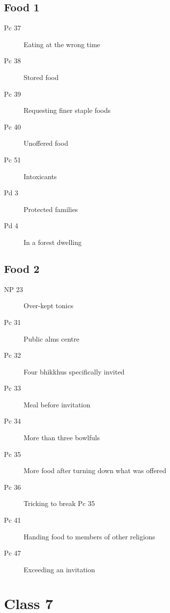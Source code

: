 \documentclass[11pt,oneside]{memoir}
\begin{document}
\begin{multicols}{2}

\section{Food 1}

\begin{description}
\item[Pc 37] Eating at the wrong time
\item[Pc 38 \orig] Stored food%
\item[Pc 39] Requesting finer staple foods
\item[Pc 40 \orig] Unoffered food%
\item[Pc 51 \orig] Intoxicants%
\item[Pd 3] Protected families
\item[Pd 4 \orig] In a forest dwelling%
\end{description}

\columnbreak

\section{Food 2}

\begin{description}
\item[NP 23 \orig] Over-kept tonics%
\item[Pc 31 \orig] Public alms centre%
\item[Pc 32] Four bhikkhus specifically invited
\item[Pc 33] Meal before invitation
\item[Pc 34] More than three bowlfuls
\item[Pc 35 \orig] More food after turning down what was offered%
\item[Pc 36 \orig] Tricking to break Pc 35%
\item[Pc 41 \orig] Handing food to members of other religions%
\item[Pc 47 \orig] Exceeding an invitation%
\end{description}

\end{multicols}

\clearpage

\chapter{Class 7}
\end{document}
